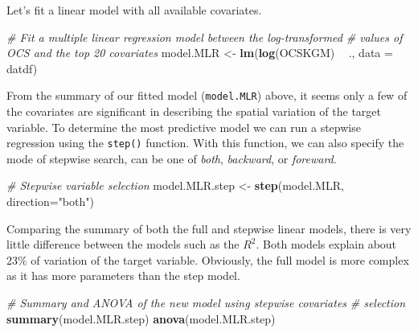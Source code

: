 \documentclass[10pt,b5paper,]{book}
\newenvironment{Shaded}{\begin{snugshade}}{\end{snugshade}}
\newcommand{\CommentTok}[1]{\textcolor[rgb]{0.56,0.35,0.01}{\textit{#1}}}
\newcommand{\DataTypeTok}[1]{\textcolor[rgb]{0.13,0.29,0.53}{#1}}
\newcommand{\KeywordTok}[1]{\textcolor[rgb]{0.13,0.29,0.53}{\textbf{#1}}}
\newcommand{\NormalTok}[1]{#1}
\newcommand{\OperatorTok}[1]{\textcolor[rgb]{0.81,0.36,0.00}{\textbf{#1}}}
\newcommand{\StringTok}[1]{\textcolor[rgb]{0.31,0.60,0.02}{#1}}
\theoremstyle{definition}
\theoremstyle{definition}
\theoremstyle{definition}
\theoremstyle{remark}
\begin{document}
Let's fit a linear model with all available covariates.

\begin{Shaded}
\begin{Highlighting}[]
\CommentTok{# Fit a multiple linear regression model between the log-transformed}
\CommentTok{# values of OCS and the top 20 covariates}
\NormalTok{model.MLR <-}\StringTok{ }\KeywordTok{lm}\NormalTok{(}\KeywordTok{log}\NormalTok{(OCSKGM) }\OperatorTok{~}\StringTok{ }\NormalTok{., }\DataTypeTok{data =}\NormalTok{ datdf)}
\end{Highlighting}
\end{Shaded}

From the summary of our fitted model (\texttt{model.MLR}) above, it
seems only a few of the covariates are significant in describing the
spatial variation of the target variable. To determine the most
predictive model we can run a stepwise regression
 using the \texttt{step()} function.
With this function, we can also specify the mode of stepwise search, can
be one of \emph{both}, \emph{backward}, or \emph{foreward}.

\begin{Shaded}
\begin{Highlighting}[]
\CommentTok{# Stepwise variable selection}
\NormalTok{model.MLR.step <-}\StringTok{ }\KeywordTok{step}\NormalTok{(model.MLR, }\DataTypeTok{direction=}\StringTok{"both"}\NormalTok{)}
\end{Highlighting}
\end{Shaded}

Comparing the summary of both the full and stepwise linear models, there
is very little difference between the models such as the \(R^2\). Both
models explain about 23\% of variation of the target variable.
Obviously, the full model is more complex as it has more parameters than
the step model.

\begin{Shaded}
\begin{Highlighting}[]
\CommentTok{# Summary and ANOVA of the new model using stepwise covariates}
\CommentTok{# selection}
\KeywordTok{summary}\NormalTok{(model.MLR.step)}
\KeywordTok{anova}\NormalTok{(model.MLR.step)}
\end{Highlighting}
\end{Shaded}
\end{document}
